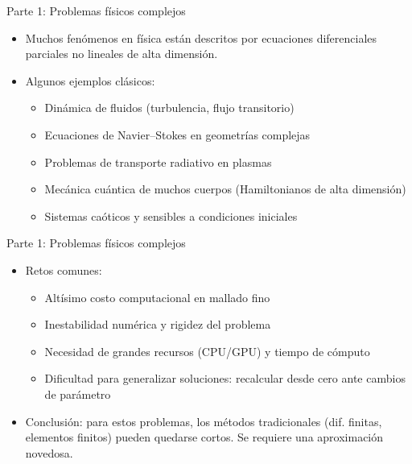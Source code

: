 
\begin{frame}{Parte 1: Problemas físicos complejos}
  \begin{itemize}
    \item Muchos fenómenos en física están descritos por ecuaciones diferenciales parciales no lineales de alta dimensión.
    \item Algunos ejemplos clásicos:
      \begin{itemize}
        \item Dinámica de fluidos (turbulencia, flujo transitorio)
        \item Ecuaciones de Navier–Stokes en geometrías complejas
        \item Problemas de transporte radiativo en plasmas
        \item Mecánica cuántica de muchos cuerpos (Hamiltonianos de alta dimensión)
        \item Sistemas caóticos y sensibles a condiciones iniciales
      \end{itemize}
    
  \end{itemize}
\end{frame}


\begin{frame}{Parte 1: Problemas físicos complejos}
	\begin{itemize}
		\item Retos comunes:
      \begin{itemize}
        \item Altísimo costo computacional en mallado fino
        \item Inestabilidad numérica y rigidez del problema
        \item Necesidad de grandes recursos (CPU/GPU) y tiempo de cómputo
        \item Dificultad para generalizar soluciones: recalcular desde cero ante cambios de parámetro
      \end{itemize}
    \item Conclusión: para estos problemas, los métodos tradicionales (dif. finitas, elementos finitos) pueden quedarse cortos. \alert{Se requiere una aproximación novedosa.}
	\end{itemize}
\end{frame}
